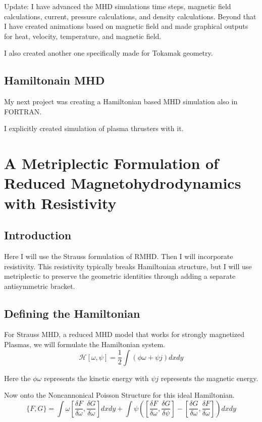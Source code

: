 \par Update: I have advanced the MHD simulations time steps, magnetic field calculations, current, pressure calculations, and density calculations. Beyond that I have created animations based on magnetic field and made graphical outputs for heat, velocity, temperature, and magnetic field.
\par I also created another one specifically made for Tokamak geometry.
\subsection{Hamiltonain MHD}
\par My next project was creating a Hamiltonian based MHD simulation also in FORTRAN. 
\par I explicitly created simulation of plasma thrusters with it.

\section{A Metriplectic Formulation of Reduced Magnetohydrodynamics with Resistivity}
\subsection{Introduction}
\par Here I will use the Strauss formulation of RMHD. Then I will incorporate resistivity. This resistivity typically breaks Hamiltonian structure, but I will use metriplectic to preserve the geometric identities through adding a separate antisymmetric bracket.
\subsection{Defining the Hamiltonian}
\par For Strauss MHD, a reduced MHD model that works for strongly magnetized Plasmas, we will formulate the Hamiltonian system.
$$\mathcal{H}[\omega, \psi]=\frac{1}{2} \int(\phi \omega + \psi j)dxdy$$
\par Here the $\phi \omega$ represents the kinetic energy with $\psi j$ represents the magnetic energy.
\par Now onto the Noncannonical Poisson Structure for this ideal Hamiltonian.
$$ \{ F,G \}=\int \omega[\frac{\delta F}{\delta \omega},\frac{\delta G}{\delta \omega}]dxdy+ \int \psi ([\frac{\delta F}{\delta \omega},\frac{\delta G}{\delta \psi}]-[\frac{\delta G}{\delta \omega},\frac{\delta F}{\delta \omega}])dxdy  $$
